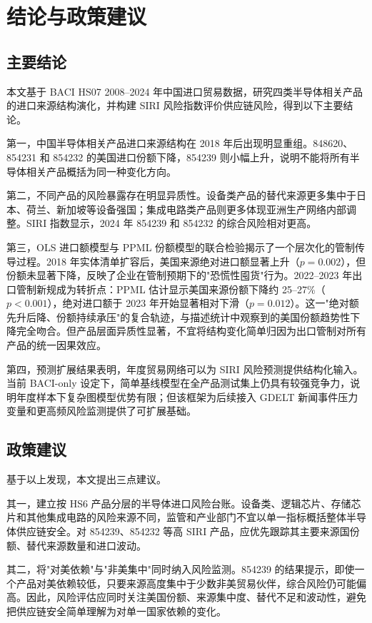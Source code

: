 \section{结论与政策建议}

\subsection{主要结论}

本文基于 BACI HS07 2008--2024 年中国进口贸易数据，研究四类半导体相关产品的进口来源结构演化，并构建 SIRI 风险指数评价供应链风险，得到以下主要结论。

第一，中国半导体相关产品进口来源结构在 2018 年后出现明显重组。848620、854231 和 854232 的美国进口份额下降，854239 则小幅上升，说明不能将所有半导体相关产品概括为同一种变化方向。

第二，不同产品的风险暴露存在明显异质性。设备类产品的替代来源更多集中于日本、荷兰、新加坡等设备强国；集成电路类产品则更多体现亚洲生产网络内部调整。SIRI 指数显示，2024 年 854239 和 854232 的综合风险相对更高。

第三，OLS 进口额模型与 PPML 份额模型的联合检验揭示了一个层次化的管制传导过程。2018 年实体清单扩容后，美国来源绝对进口额显著上升（$p=0.002$），但份额未显著下降，反映了企业在管制预期下的"恐慌性囤货"行为。2022--2023 年出口管制新规成为转折点：PPML 估计显示美国来源份额下降约 25--27\%（$p<0.001$），绝对进口额于 2023 年开始显著相对下滑（$p=0.012$）。这一"绝对额先升后降、份额持续承压"的复合轨迹，与描述统计中观察到的美国份额趋势性下降完全吻合。但产品层面异质性显著，不宜将结构变化简单归因为出口管制对所有产品的统一因果效应。

第四，预测扩展结果表明，年度贸易网络可以为 SIRI 风险预测提供结构化输入。当前 BACI-only 设定下，简单基线模型在全产品测试集上仍具有较强竞争力，说明年度样本下复杂图模型优势有限；但该框架为后续接入 GDELT 新闻事件压力变量和更高频风险监测提供了可扩展基础。

\subsection{政策建议}

基于以上发现，本文提出三点建议。

其一，建立按 HS6 产品分层的半导体进口风险台账。设备类、逻辑芯片、存储芯片和其他集成电路的风险来源不同，监管和产业部门不宜以单一指标概括整体半导体供应链安全。对 854239、854232 等高 SIRI 产品，应优先跟踪其主要来源国份额、替代来源数量和进口波动。

其二，将"对美依赖"与"非美集中"同时纳入风险监测。854239 的结果提示，即使一个产品对美依赖较低，只要来源高度集中于少数非美贸易伙伴，综合风险仍可能偏高。因此，风险评估应同时关注美国份额、来源集中度、替代不足和波动性，避免把供应链安全简单理解为对单一国家依赖的变化。

